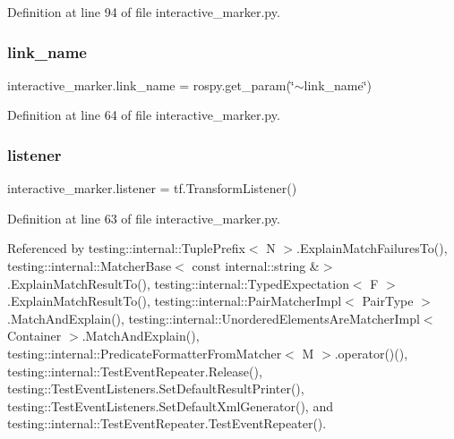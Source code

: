 Definition at line 94 of file interactive\+\_\+marker.\+py.

\mbox{\label{namespaceinteractive__marker_ad4be871390c9720f44a629c719c96923}} 
\subsubsection{\texorpdfstring{link\+\_\+name}{link\_name}}
{\footnotesize\ttfamily interactive\+\_\+marker.\+link\+\_\+name = rospy.\+get\+\_\+param(\char`\"{}$\sim$link\+\_\+name\char`\"{})}



Definition at line 64 of file interactive\+\_\+marker.\+py.

\mbox{\label{namespaceinteractive__marker_a0e579ab555212bb5e2c9f8a675b7618a}} 
\subsubsection{\texorpdfstring{listener}{listener}}
{\footnotesize\ttfamily interactive\+\_\+marker.\+listener = tf.\+Transform\+Listener()}



Definition at line 63 of file interactive\+\_\+marker.\+py.



Referenced by testing\+::internal\+::\+Tuple\+Prefix$<$ N $>$.\+Explain\+Match\+Failures\+To(), testing\+::internal\+::\+Matcher\+Base$<$ const internal\+::string \&$>$.\+Explain\+Match\+Result\+To(), testing\+::internal\+::\+Typed\+Expectation$<$ F $>$.\+Explain\+Match\+Result\+To(), testing\+::internal\+::\+Pair\+Matcher\+Impl$<$ Pair\+Type $>$.\+Match\+And\+Explain(), testing\+::internal\+::\+Unordered\+Elements\+Are\+Matcher\+Impl$<$ Container $>$.\+Match\+And\+Explain(), testing\+::internal\+::\+Predicate\+Formatter\+From\+Matcher$<$ M $>$.\+operator()(), testing\+::internal\+::\+Test\+Event\+Repeater.\+Release(), testing\+::\+Test\+Event\+Listeners.\+Set\+Default\+Result\+Printer(), testing\+::\+Test\+Event\+Listeners.\+Set\+Default\+Xml\+Generator(), and testing\+::internal\+::\+Test\+Event\+Repeater.\+Test\+Event\+Repeater().

